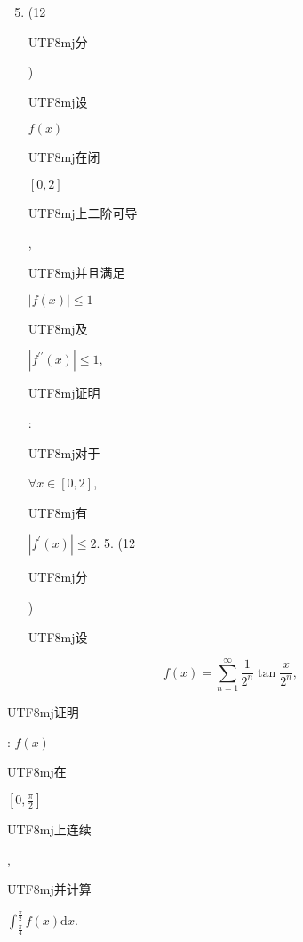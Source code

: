 \documentclass[10pt]{article}
\begin{document}
\begin{enumerate}
  \setcounter{enumi}{4}
  \item (12 \begin{CJK}{UTF8}{mj}分\end{CJK}) \begin{CJK}{UTF8}{mj}设\end{CJK} $f(x)$ \begin{CJK}{UTF8}{mj}在闭\end{CJK} $[0,2]$ \begin{CJK}{UTF8}{mj}上二阶可导\end{CJK}, \begin{CJK}{UTF8}{mj}并且满足\end{CJK} $|f(x)| \leqslant 1$ \begin{CJK}{UTF8}{mj}及\end{CJK} $\left|f^{\prime \prime}(x)\right| \leqslant 1$, \begin{CJK}{UTF8}{mj}证明\end{CJK}: \begin{CJK}{UTF8}{mj}对于\end{CJK} $\forall x \in[0,2]$, \begin{CJK}{UTF8}{mj}有\end{CJK} $\left|f^{\prime}(x)\right| \leqslant 2$. 5. (12 \begin{CJK}{UTF8}{mj}分\end{CJK}) \begin{CJK}{UTF8}{mj}设\end{CJK}
\end{enumerate}
$$
f(x)=\sum_{n=1}^{\infty} \frac{1}{2^{n}} \tan \frac{x}{2^{n}},
$$
\begin{CJK}{UTF8}{mj}证明\end{CJK}: $f(x)$ \begin{CJK}{UTF8}{mj}在\end{CJK} $\left[0, \frac{\pi}{2}\right]$ \begin{CJK}{UTF8}{mj}上连续\end{CJK}, \begin{CJK}{UTF8}{mj}并计算\end{CJK} $\int_{\frac{\pi}{4}}^{\frac{\pi}{2}} f(x) \mathrm{d} x$.
\end{document}
